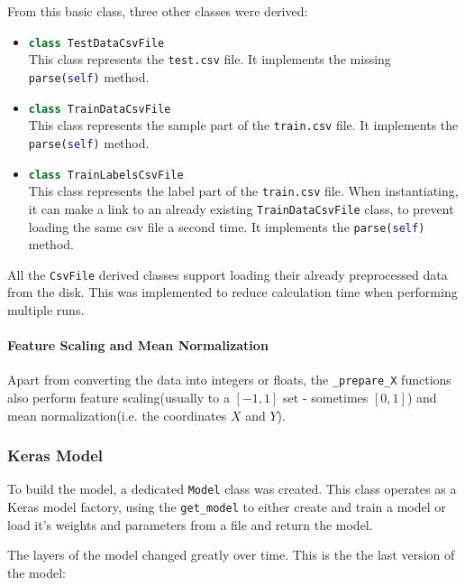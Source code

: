 \documentclass[12pt,a4paper]{scrartcl}
\newcommand{\inlinelisting}[1]{\colorbox{BackgroundColour!95!ForegroundColour}{\color{ForegroundColour!70!BackgroundColour}\lstinline[columns=fixed,language=python]{#1}}}
\begin{document}
From this basic class, three other classes were derived:
\begin{itemize}
\item \inlinelisting{class TestDataCsvFile}\\
This class represents the \texttt{test.csv} file. It implements the missing \inlinelisting{parse(self)} method.
\item \inlinelisting{class TrainDataCsvFile}\\
This class represents the sample part of the \texttt{train.csv} file. It implements the \inlinelisting{parse(self)} method.
\item \inlinelisting{class TrainLabelsCsvFile}\\
This class represents the label part of the \texttt{train.csv} file. When instantiating, it can make a link to an already existing \inlinelisting{TrainDataCsvFile} class, to prevent loading the same csv file a second time. It implements the \inlinelisting{parse(self)} method.
\end{itemize}

All the \inlinelisting{CsvFile} derived classes support loading their already preprocessed data from the disk. This was implemented to reduce calculation time when performing multiple runs.

\paragraph{Feature Scaling and Mean Normalization}\label{p:feature_scaling_mean_normal}
Apart from converting the data into integers or floats, the \inlinelisting{_prepare_X} functions also perform feature scaling(usually to a $[-1, 1]$ set - sometimes $[0, 1]$) and mean normalization(i.e. the coordinates $X$ and $Y$).

\subsubsection{Keras Model}\label{sss:keras_model1}
To build the model, a dedicated \inlinelisting{Model} class was created. This class operates as a Keras model factory, using the \inlinelisting{get_model} to either create and train a model or load it's weights and parameters from a file and return the model.

The layers of the model changed greatly over time. This is the the last version of the model:


\end{document}
